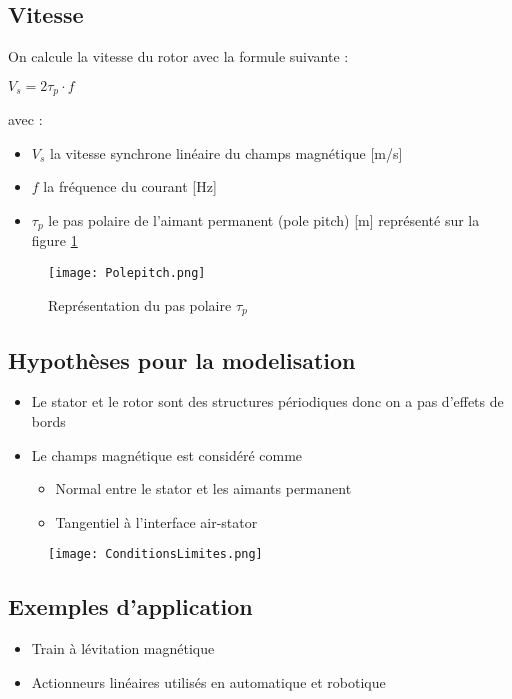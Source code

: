 \subsection*{Vitesse}
On calcule la vitesse du rotor avec la formule suivante : 
\begin{center}
    $V_s = 2\tau_p \cdot f$
\end{center}
avec : 
\begin{itemize}
    \item $V_s$ la vitesse synchrone linéaire du champs magnétique [m/s]
    \item $f$ la fréquence du courant [Hz]
    \item $\tau_p$ le pas polaire de l'aimant permanent (pole pitch) [m] représenté sur la figure \ref{polepitch}
\end{itemize}
\begin{figure}[H]
    \centering
    \texttt{[image: Polepitch.png]}
    \caption{Représentation du pas polaire $\tau_p$}
    \label{polepitch}

\end{figure}
\subsection*{Hypothèses pour la modelisation}
\begin{itemize}
    \item Le stator et le rotor sont des structures périodiques donc on a pas d'effets de bords
    \item Le champs magnétique est considéré comme \begin{itemize}
        \item Normal entre le stator et les aimants permanent
        \item Tangentiel à l'interface air-stator
    \end{itemize}
\end{itemize}

\begin{figure}[H]
    \centering
    \texttt{[image: ConditionsLimites.png]}
\end{figure}

\subsection*{Exemples d'application}
\begin{itemize}
\item Train à lévitation magnétique
\item Actionneurs linéaires utilisés en automatique et robotique
\end{itemize}
